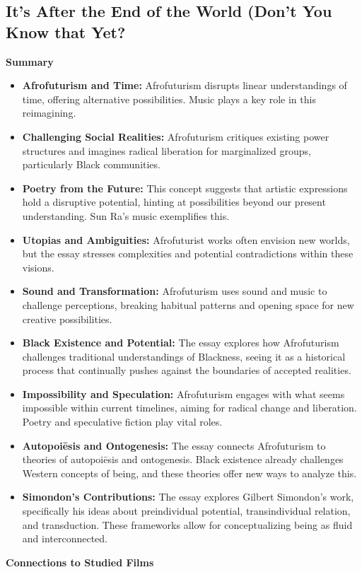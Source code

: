 \documentclass[11pt,fleqn]{book}
\begin{document}
\subsection{It’s After the End of the World (Don’t You Know that Yet?}
\textbf{Summary}

\begin{itemize}
\item \textbf{Afrofuturism and Time:}  Afrofuturism disrupts linear understandings of time, offering alternative possibilities. Music plays a key role in this reimagining.

\item \textbf{Challenging Social Realities:} Afrofuturism critiques existing power structures and imagines radical liberation for marginalized groups, particularly Black communities.  

\item \textbf{Poetry from the Future:} This concept suggests that artistic expressions hold a disruptive potential, hinting at possibilities beyond our present understanding. Sun Ra's music exemplifies this.

\item \textbf{Utopias and Ambiguities:} Afrofuturist works often envision new worlds, but the essay stresses complexities and potential contradictions within these visions.

\item \textbf{Sound and Transformation:} Afrofuturism uses sound and music to challenge perceptions, breaking habitual patterns and opening space for new creative possibilities. 

\item \textbf{Black Existence and Potential:} The essay explores how Afrofuturism challenges traditional understandings of Blackness, seeing it as a historical process that continually pushes against the boundaries of accepted realities.

\item \textbf{Impossibility and Speculation:} Afrofuturism engages with what seems impossible within current timelines, aiming for radical change and liberation. Poetry and speculative fiction play vital roles.

\item \textbf{Autopoiēsis and Ontogenesis:} The essay connects Afrofuturism to theories of autopoiēsis and ontogenesis. Black existence already challenges Western concepts of being, and these theories offer new ways to analyze this.

\item \textbf{Simondon's Contributions:} The essay explores Gilbert Simondon's work, specifically his ideas about preindividual potential, transindividual relation, and transduction. These frameworks allow for conceptualizing being as fluid and interconnected. 
\end{itemize}
\vspace{5pt}
\textbf{Connections to Studied Films}
\end{document}
